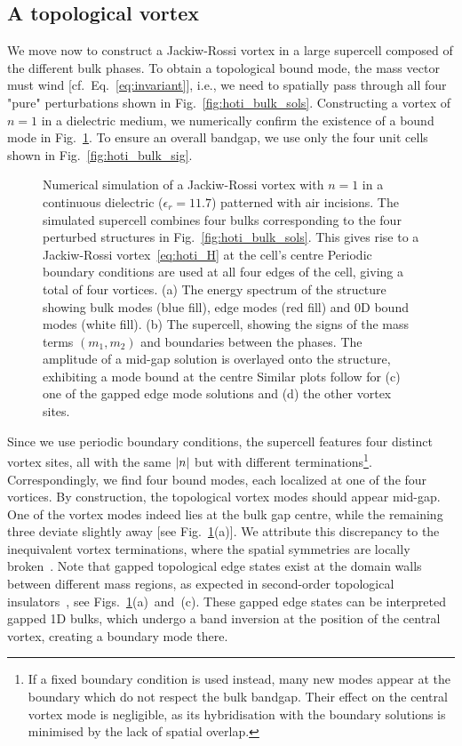 \subsection{A topological vortex}

We move now to construct a Jackiw-Rossi vortex in a large supercell composed of the different bulk phases. To obtain a topological bound mode, the mass vector must wind [cf.~Eq.~\eqref{eq:invariant}], i.e., we need to spatially pass through all four "pure" perturbations shown in Fig.~\ref{fig:hoti_bulk_sols}. 
Constructing a vortex of $n=1$ in a dielectric medium, we numerically confirm the existence of a bound mode in Fig.~\ref{fig:hoti_fig4}. To ensure an overall bandgap, we use only the four unit cells shown in Fig.~\ref{fig:hoti_bulk_sig}.
%
\begin{figure} [h!]
	\centering
	
	\caption{Numerical simulation of a Jackiw-Rossi vortex with $n = 1$ in a continuous dielectric ($\epsilon_r = 11.7$) patterned with air incisions. The simulated supercell combines four bulks corresponding to the four perturbed structures in Fig.~\ref{fig:hoti_bulk_sols}. This gives rise to a Jackiw-Rossi vortex~\eqref{eq:hoti_H} at the cell's centre Periodic boundary conditions are used at all four edges of the cell, giving a total of four vortices. (a) The energy spectrum of the structure showing bulk modes (blue fill), edge modes (red fill) and 0D bound modes (white fill). (b) The supercell, showing the signs of the mass terms $(m_1, m_2)$ and boundaries between the phases. The amplitude of a mid-gap solution is overlayed onto the structure, exhibiting a mode bound at the centre Similar plots follow for (c) one of the gapped edge mode solutions and (d) the other vortex sites.}
	\label{fig:hoti_fig4}
\end{figure}
%
Since we use periodic boundary conditions, the supercell features four distinct vortex sites, all with the same $\abs{n}$ but with different terminations\footnote{If a fixed boundary condition is used instead, many new modes appear at the boundary which do not respect the bulk bandgap. Their effect on the central vortex mode is negligible, as its hybridisation with the boundary solutions is minimised by the lack of spatial overlap.}. Correspondingly, we find four bound modes, each localized at one of the four vortices. By construction, the topological vortex modes should appear mid-gap. One of the vortex modes indeed lies at the bulk gap centre, while the remaining three deviate slightly away [see Fig.~\ref{fig:hoti_fig4}(a)]. We attribute this discrepancy to the inequivalent vortex terminations, where the spatial symmetries are locally broken~\cite{Gao_2020}. Note that gapped topological edge states exist at the domain walls between different mass regions, as expected in second-order topological insulators~\cite{Benalcazar_2017a,Benalcazar_2017b,Petrides_2020}, see Figs.~\ref{fig:hoti_fig4}(a)~and~(c). These gapped edge states can be interpreted gapped 1D bulks, which undergo a band inversion at the position of the central vortex, creating a boundary mode there.  

